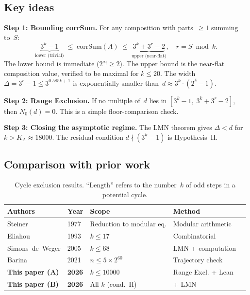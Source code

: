 \documentclass[11pt, a4paper]{amsart}
\theoremstyle{plain}
\theoremstyle{definition}
\theoremstyle{remark}
\newcommand{\corrSum}{\mathrm{corrSum}}
\begin{document}
\subsection{Key ideas}\label{ssec:key-ideas}

\textbf{Step 1: Bounding corrSum.}
For any composition with parts~$\geq 1$ summing to~$S$:
\begin{equation}\label{eq:bounds}
  \underbrace{3^k - 1}_{\text{lower (trivial)}}
  \;\leq\; \corrSum(A) \;\leq\;
  \underbrace{3^k + 3^r - 2}_{\text{upper (near-flat)}},
  \quad r = S \bmod k.
\end{equation}
The lower bound is immediate ($2^{a_j} \geq 2$).
The upper bound is the near-flat composition value,
verified to be maximal for $k \leq 20$.
The width $\Delta = 3^r - 1 \leq 3^{0.585k+1}$ is
exponentially smaller than~$d \approx 3^k \cdot (2^\delta - 1)$.

\textbf{Step 2: Range Exclusion.}
If no multiple of~$d$ lies in $[3^k - 1,\; 3^k + 3^r - 2]$,
then $N_0(d) = 0$.  This is a simple floor-comparison check.

\textbf{Step 3: Closing the asymptotic regime.}
The LMN theorem gives $\Delta < d$ for $k > K_A \approx 18000$.
The residual condition $d \nmid (3^k - 1)$ is Hypothesis~H.

\subsection{Comparison with prior work}\label{ssec:comparison}

\begin{table}[ht]
\centering
\caption{Cycle exclusion results.  ``Length'' refers to the
number~$k$ of odd steps in a potential cycle.}
\label{tab:comparison}
\begin{tabular}{lllll}
\toprule
Authors & Year & Scope & Method \\
\midrule
Steiner & 1977 & Reduction to modular eq. & Modular arithmetic \\
Eliahou & 1993 & $k \leq 17$ & Combinatorial \\
Simons--de~Weger & 2005 & $k \leq 68$ & LMN + computation \\
Barina & 2021 & $n \leq 5 \times 2^{60}$ & Trajectory check \\
\textbf{This paper (A)} & \textbf{2026} & $k \leq 10000$ & Range Excl. + Lean \\
\textbf{This paper (B)} & \textbf{2026} & All $k$ (cond.~H) & + LMN \\
\bottomrule
\end{tabular}
\end{table}
\end{document}
